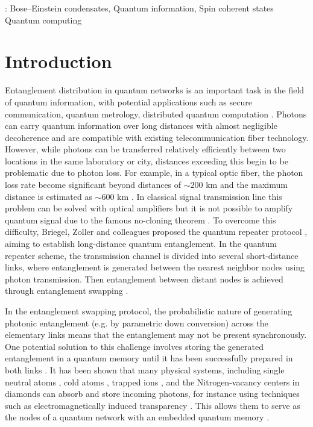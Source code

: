 \documentclass[12pt]{iopart}
\begin{document}
:
Bose–Einstein condensates, 
Quantum information, 
Spin coherent states
Quantum computing

\maketitle


\section{Introduction}

Entanglement distribution in quantum networks is an important task in the field of quantum information, with potential applications such as secure communication, quantum metrology, distributed quantum computation \cite{Wei2022,Wehner2018,Azuma2023}. Photons can carry quantum information over long distances with almost negligible decoherence and are compatible with existing telecommunication fiber technology.  
However, while photons can be transferred relatively efficiently between two locations in the same laboratory or city, distances exceeding this begin to be problematic due to photon loss. 
For example, in a typical optic fiber, the photon loss rate become significant beyond distances of $ \sim 200 $ km and the maximum distance is estimated as $\sim 600$ km \cite{Pirandola2017, Yingqiu2021}. 
In classical signal transmission line this problem can be solved with optical amplifiers but it is not possible to amplify quantum signal due to the famous no-cloning theorem \cite{Park1970, Wootters1982, Nielsen2010}. To overcome this difficulty, Briegel, Zoller and colleagues proposed the quantum repeater protocol \cite{Briegel1998}, 
aiming to establish long-distance quantum entanglement. 
In the quantum repeater scheme, the transmission channel is divided into several short-distance links, where entanglement is generated between the nearest neighbor nodes using photon transmission.  Then entanglement between distant nodes is achieved through entanglement swapping \cite{bennett1993teleporting,zukowski1993event,Pan1998}. 

In the entanglement swapping protocol, the probabilistic nature of generating photonic entanglement (e.g. by parametric down conversion) across the elementary links means that the entanglement may not be present synchronously.  One potential solution to this challenge involves storing the generated entanglement in a quantum memory until it has been successfully prepared in both links \cite{Lvovsky2009, Simon2010, Heshami2016}. It has been shown that many physical systems, including single neutral atoms \cite{Reiserer2015,Rosenfeld2008}, 
cold atoms \cite{Sangouard2011}, 
trapped ions \cite{Duan2010}, 
and the Nitrogen-vacancy centers in diamonds \cite{Childress2006, Gurudev2007,hermans2022qubit}  
can absorb and store incoming photons, 
for instance using techniques such as electromagnetically induced transparency \cite{Fleischhauer2005}.  This allows them to serve as the nodes of a quantum network with an embedded quantum memory \cite{Duan2001,Duan2010,Ritter2012}. 
\end{document}
